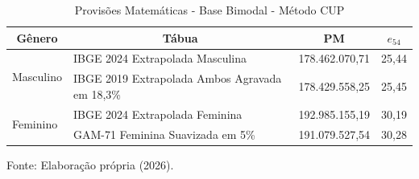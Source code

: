 \begin{table}[htbp]
    \centering
    \caption{Provisões Matemáticas - Base Bimodal - Método CUP}
    \begin{threeparttable}
    \renewcommand{\arraystretch}{1.0}
    \begin{tabular}{llrr}
    \toprule
    \multicolumn{1}{c}{\textbf{Gênero}} & \multicolumn{1}{c}{\textbf{Tábua}} & \multicolumn{1}{c}{\textbf{PM}} & \multicolumn{1}{c}{\textbf{$e_{54}$}} \\ \midrule
    \multirow{2}{*}{Masculino} & IBGE 2024 Extrapolada Masculina & 178.462.070,71 & 25,44 \\
                                & IBGE 2019 Extrapolada Ambos Agravada em 18,3\% & 178.429.558,25 & 25,45 \\ \hline
    \multirow{2}{*}{Feminino} & IBGE 2024 Extrapolada Feminina & 192.985.155,19 & 30,19 \\
                                & GAM-71 Feminina Suavizada em 5\% & 191.079.527,54 & 30,28 \\ \bottomrule
    \end{tabular}
    \begin{tablenotes}[flushleft]
        \small
        \item Fonte: Elaboração própria (2026).
    \end{tablenotes}
    \end{threeparttable}
    \label{tab:bimodal-CUP}
\end{table}
\vspace{0.5cm}
